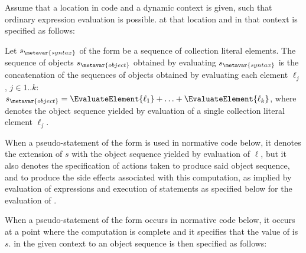 \documentclass[makeidx]{article}
\begin{document}
{

\LMHash{}%
Assume that a location in code and a dynamic context is given,
such that ordinary expression evaluation is possible.
at that location and in that context is specified as follows:

\LMHash{}%
Let $s_{\metavar{syntax}}$ of the form  be
a sequence of collection literal elements.
The sequence of objects $s_{\metavar{object}}$
obtained by evaluating $s_{\metavar{syntax}}$
is the concatenation of the sequences of objects
obtained by evaluating each element $\ell_j$, $j \in 1 .. k$:
$s_{\metavar{object}}=\EvaluateElement{\ell_1}+\ldots+\EvaluateElement{\ell_k}$,
where  denotes the object sequence yielded by
evaluation of a single collection literal element $\ell_j$.

\LMHash{}%
When a pseudo-statement of the form
is used in normative code below,
it denotes the extension of $s$ with the object sequence
yielded by evaluation of $\ell$,
but it also denotes the specification of actions taken to produce
said object sequence,
and to produce the side effects associated with this computation,
as implied by evaluation of expressions and execution of statements
as specified below for the evaluation of \EvaluateElement{\ell}.

\LMHash{}%
When a pseudo-statement of the form
occurs in normative code below,
it occurs at a point where the computation is complete
and it specifies that the value of \EvaluateElement{\ell} is $s$.
in the given context
to an object sequence
is then specified as follows:

}
\end{document}
